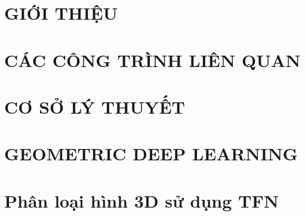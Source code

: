 \documentclass[a4paper, 12pt]{report}
\begin{document}
\renewcommand{\thepage}{\roman{page}}






%  
%
\newpage
%  
\setlength{\parskip}{0pt}


% 

% 

\tableofcontents
{}
\listoffigures  


\newpage 

\clearpage
\setcounter{page}{1}
\setcounter{chapter}{0}

\renewcommand{\thepage}{\arabic{page}}	

\setlength{\parskip}{1em}



\chapter{GIỚI THIỆU}


\chapter{CÁC CÔNG TRÌNH LIÊN QUAN}


\chapter{CƠ SỞ LÝ THUYẾT}



\chapter{GEOMETRIC DEEP LEARNING}


\chapter{Phân loại hình 3D sử dụng TFN}

\end{document}

